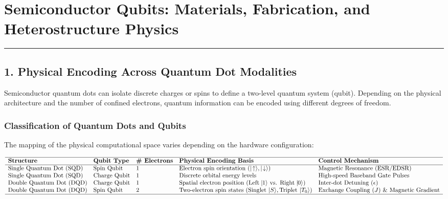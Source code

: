 \documentclass[
]{article}
\begin{document}
\section{Semiconductor Qubits: Materials, Fabrication, and
Heterostructure
Physics}\label{semiconductor-qubits-materials-fabrication-and-heterostructure-physics}

\begin{center}\rule{0.5\linewidth}{0.5pt}\end{center}

\subsection{1. Physical Encoding Across Quantum Dot
Modalities}\label{physical-encoding-across-quantum-dot-modalities}

Semiconductor quantum dots can isolate discrete charges or spins to
define a two-level quantum system (qubit). Depending on the physical
architecture and the number of confined electrons, quantum information
can be encoded using different degrees of freedom.

\subsubsection{Classification of Quantum Dots and
Qubits}\label{classification-of-quantum-dots-and-qubits}

The mapping of the physical computational space varies depending on the
hardware configuration:

\[\begin{array}{lllll}
\hline
\textbf{Structure} & \textbf{Qubit Type} & \textbf{\# Electrons} & \textbf{Physical Encoding Basis} & \textbf{Control Mechanism} \\ \hline
\text{Single Quantum Dot (SQD)} & \text{Spin Qubit} & 1 & \text{Electron spin orientation } (|\!\uparrow\rangle, |\!\downarrow\rangle) & \text{Magnetic Resonance (ESR/EDSR)} \\
\text{Single Quantum Dot (SQD)} & \text{Charge Qubit} & 1 & \text{Discrete orbital energy levels} & \text{High-speed Baseband Gate Pulses} \\
\text{Double Quantum Dot (DQD)} & \text{Charge Qubit} & 1 & \text{Spatial electron position } (\text{Left} \mid\!\!1\rangle \text{ vs. Right} \mid\!\!0\rangle) & \text{Inter-dot Detuning } (\epsilon) \\
\text{Double Quantum Dot (DQD)} & \text{Spin Qubit} & 2 & \text{Two-electron spin states } (\text{Singlet } |S\rangle, \text{Triplet } |T_0\rangle) & \text{Exchange Coupling } (J) \text{ \& Magnetic Gradient} \\ \hline
\end{array}\]
\end{document}
